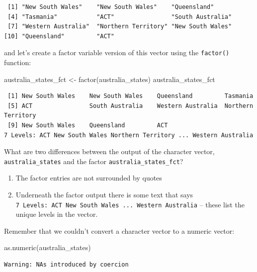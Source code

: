 \documentclass[
  letterpaper,
  DIV=11,
  numbers=noendperiod]{scrreprt}
\newenvironment{Shaded}{\begin{snugshade}}{\end{snugshade}}
\newcommand{\FunctionTok}[1]{\textcolor[rgb]{0.28,0.35,0.67}{#1}}
\newcommand{\NormalTok}[1]{\textcolor[rgb]{0.00,0.23,0.31}{#1}}
\newcommand{\OtherTok}[1]{\textcolor[rgb]{0.00,0.23,0.31}{#1}}
\begin{document}
\begin{verbatim}
 [1] "New South Wales"    "New South Wales"    "Queensland"        
 [4] "Tasmania"           "ACT"                "South Australia"   
 [7] "Western Australia"  "Northern Territory" "New South Wales"   
[10] "Queensland"         "ACT"               
\end{verbatim}

and let's create a factor variable version of this vector using the
\texttt{factor()} function:

\begin{Shaded}
\begin{Highlighting}[]
\NormalTok{australia\_states\_fct }\OtherTok{\textless{}{-}} \FunctionTok{factor}\NormalTok{(australia\_states)}
\NormalTok{australia\_states\_fct}
\end{Highlighting}
\end{Shaded}

\begin{verbatim}
 [1] New South Wales    New South Wales    Queensland         Tasmania          
 [5] ACT                South Australia    Western Australia  Northern Territory
 [9] New South Wales    Queensland         ACT               
7 Levels: ACT New South Wales Northern Territory ... Western Australia
\end{verbatim}

What are two differences between the output of the character vector,
\texttt{australia\_states} and the factor
\texttt{australia\_states\_fct}?

\begin{enumerate}
\def\labelenumi{\arabic{enumi}.}
\item
  The factor entries are not surrounded by quotes
\item
  Underneath the factor output there is some text that says
  \texttt{7\ Levels:\ ACT\ New\ South\ Wales\ ...\ Western\ Australia}
  -- these list the unique levels in the vector.
\end{enumerate}

Remember that we couldn't convert a character vector to a numeric
vector:

\begin{Shaded}
\begin{Highlighting}[]
\FunctionTok{as.numeric}\NormalTok{(australia\_states)}
\end{Highlighting}
\end{Shaded}

\begin{verbatim}
Warning: NAs introduced by coercion
\end{verbatim}
\end{document}
